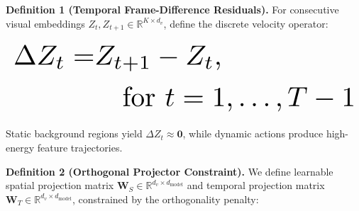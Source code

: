\documentclass{article}
\begin{document}
\textbf{Definition 1 (Temporal Frame-Difference Residuals).} For consecutive visual embeddings $Z_t, Z_{t+1} \in \mathbb{R}^{K \times d_v}$, define the discrete velocity operator:



























\begin{equation}
\resizebox{\columnwidth}{!}{$\displaystyle
\begin{aligned}
\Delta Z_t = & Z_{t+1} - Z_t, \\
& \quad \text{for } t = 1, \ldots, T-1
\end{aligned}
$}
\end{equation}



























Static background regions yield $\Delta Z_t \approx \mathbf{0}$, while dynamic actions produce high-energy feature trajectories.

\textbf{Definition 2 (Orthogonal Projector Constraint).} We define learnable spatial projection matrix $\mathbf{W}_S \in \mathbb{R}^{d_v \times d_{\text{model}}}$ and temporal projection matrix $\mathbf{W}_T \in \mathbb{R}^{d_v \times d_{\text{model}}}$, constrained by the orthogonality penalty:
\end{document}
